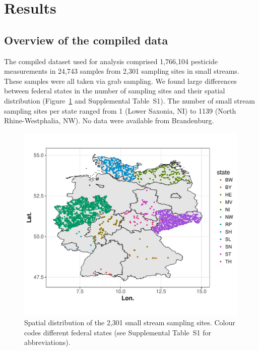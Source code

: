 \section{Results}
\subsection{Overview of the compiled data}

The compiled dataset used for analysis comprised 1,766,104 pesticide measurements in 24,743 samples from 2,301 sampling sites in small streams.  %
These samples were all taken via grab sampling.  
We found large differences between federal states in the number of sampling sites and their spatial distribution (Figure~\ref{fig:ss:fig1} and Supplemental Table~S1). 
The number of small stream sampling sites per state ranged from 1 (Lower Saxonia, NI) to 1139 (North Rhine-Westphalia, NW).
No data were available from Brandenburg. 

\begin{figure}[ht]
  \includegraphics[width=1\textwidth]{chapters/smallstreams/figure1.pdf}
  \caption[Spatial distribution of the 2,301 small stream sampling sites.]{Spatial distribution of the 2,301 small stream sampling sites. Colour codes different federal states (see Supplemental Table~S1 for abbreviations).}
  \label{fig:ss:fig1}
\end{figure}

